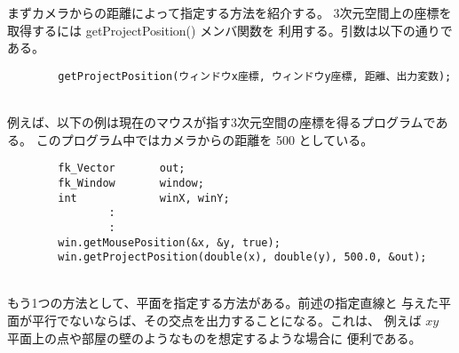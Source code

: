 まずカメラからの距離によって指定する方法を紹介する。
3次元空間上の座標を取得するには getProjectPosition() メンバ関数を
利用する。引数は以下の通りである。
\\
\begin{screen}
\begin{verbatim}
        getProjectPosition(ウィンドウx座標, ウィンドウy座標, 距離、出力変数);
\end{verbatim}
\end{screen}
~ \\
例えば、以下の例は現在のマウスが指す3次元空間の座標を得るプログラムである。
このプログラム中ではカメラからの距離を 500 としている。
\\
\begin{breakbox}
\begin{verbatim}
        fk_Vector       out;
        fk_Window       window;
        int             winX, winY;
                :
                :
        win.getMousePosition(&x, &y, true);
        win.getProjectPosition(double(x), double(y), 500.0, &out);
\end{verbatim}
\end{breakbox}
~ \\
もう1つの方法として、平面を指定する方法がある。前述の指定直線と
与えた平面が平行でないならば、その交点を出力することになる。これは、
例えば \(xy\) 平面上の点や部屋の壁のようなものを想定するような場合に
便利である。

